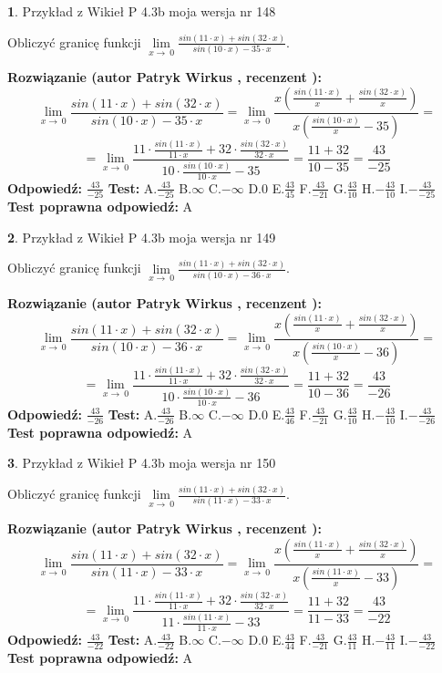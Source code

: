 \documentclass[12pt, a4paper]{article}
\theoremstyle{definition} %
\newtheorem{zad}{}
\newcommand{\zadStart}[1]{\begin{zad}#1\newline}
\newcommand{\zadStop}{\end{zad}}
\newcommand{\rozwStart}[2]{\noindent \textbf{Rozwiązanie (autor #1 , recenzent #2): }\newline}
\newcommand{\rozwStop}{\newline}
\newcommand{\odpStart}{\noindent \textbf{Odpowiedź:}\newline}
\newcommand{\odpStop}{\newline}
\newcommand{\testStart}{\noindent \textbf{Test:}\newline}
\newcommand{\testStop}{\newline}
\newcommand{\kluczStart}{\noindent \textbf{Test poprawna odpowiedź:}\newline}
\newcommand{\kluczStop}{\newline}
\begin{document}
\zadStart{Przykład z Wikieł P 4.3b moja wersja nr 148}


Obliczyć granicę funkcji $\lim\limits_{x\to\ 0}\frac{sin(11 \cdot x)+sin(32 \cdot x)}{sin(10 \cdot x)-35 \cdot x}$.
\zadStop
\rozwStart{Patryk Wirkus}{}
$$\lim\limits_{x\to\ 0}\frac{sin(11 \cdot x)+sin(32 \cdot x)}{sin(10 \cdot x)-35 \cdot x}=\lim\limits_{x\to\ 0}\frac{x(\frac{sin(11 \cdot x)}{x}+\frac{sin(32 \cdot x)}{x})}{x(\frac{sin(10 \cdot x)}{x}-35)}=$$
$$=\lim\limits_{x\to\ 0}\frac{11 \cdot \frac{sin(11 \cdot x)}{11 \cdot x}+32 \cdot \frac{sin(32 \cdot x)}{32 \cdot x}}{10 \cdot \frac{sin(10 \cdot x)}{10 \cdot x}-35}=\frac{11+32}{10-35} = \frac{43}{-25}$$
\rozwStop
\odpStart
$\frac{43}{-25}$
\odpStop
\testStart
A.$\frac{43}{-25}$
B.$\infty$
C.$-\infty$
D.$0$
E.$\frac{43}{45}$
F.$\frac{43}{-21}$
G.$\frac{43}{10}$
H.$-\frac{43}{10}$
I.$-\frac{43}{-25}$
\testStop
\kluczStart
A
\kluczStop



\zadStart{Przykład z Wikieł P 4.3b moja wersja nr 149}


Obliczyć granicę funkcji $\lim\limits_{x\to\ 0}\frac{sin(11 \cdot x)+sin(32 \cdot x)}{sin(10 \cdot x)-36 \cdot x}$.
\zadStop
\rozwStart{Patryk Wirkus}{}
$$\lim\limits_{x\to\ 0}\frac{sin(11 \cdot x)+sin(32 \cdot x)}{sin(10 \cdot x)-36 \cdot x}=\lim\limits_{x\to\ 0}\frac{x(\frac{sin(11 \cdot x)}{x}+\frac{sin(32 \cdot x)}{x})}{x(\frac{sin(10 \cdot x)}{x}-36)}=$$
$$=\lim\limits_{x\to\ 0}\frac{11 \cdot \frac{sin(11 \cdot x)}{11 \cdot x}+32 \cdot \frac{sin(32 \cdot x)}{32 \cdot x}}{10 \cdot \frac{sin(10 \cdot x)}{10 \cdot x}-36}=\frac{11+32}{10-36} = \frac{43}{-26}$$
\rozwStop
\odpStart
$\frac{43}{-26}$
\odpStop
\testStart
A.$\frac{43}{-26}$
B.$\infty$
C.$-\infty$
D.$0$
E.$\frac{43}{46}$
F.$\frac{43}{-21}$
G.$\frac{43}{10}$
H.$-\frac{43}{10}$
I.$-\frac{43}{-26}$
\testStop
\kluczStart
A
\kluczStop



\zadStart{Przykład z Wikieł P 4.3b moja wersja nr 150}


Obliczyć granicę funkcji $\lim\limits_{x\to\ 0}\frac{sin(11 \cdot x)+sin(32 \cdot x)}{sin(11 \cdot x)-33 \cdot x}$.
\zadStop
\rozwStart{Patryk Wirkus}{}
$$\lim\limits_{x\to\ 0}\frac{sin(11 \cdot x)+sin(32 \cdot x)}{sin(11 \cdot x)-33 \cdot x}=\lim\limits_{x\to\ 0}\frac{x(\frac{sin(11 \cdot x)}{x}+\frac{sin(32 \cdot x)}{x})}{x(\frac{sin(11 \cdot x)}{x}-33)}=$$
$$=\lim\limits_{x\to\ 0}\frac{11 \cdot \frac{sin(11 \cdot x)}{11 \cdot x}+32 \cdot \frac{sin(32 \cdot x)}{32 \cdot x}}{11 \cdot \frac{sin(11 \cdot x)}{11 \cdot x}-33}=\frac{11+32}{11-33} = \frac{43}{-22}$$
\rozwStop
\odpStart
$\frac{43}{-22}$
\odpStop
\testStart
A.$\frac{43}{-22}$
B.$\infty$
C.$-\infty$
D.$0$
E.$\frac{43}{44}$
F.$\frac{43}{-21}$
G.$\frac{43}{11}$
H.$-\frac{43}{11}$
I.$-\frac{43}{-22}$
\testStop
\kluczStart
A
\kluczStop
\end{document}
